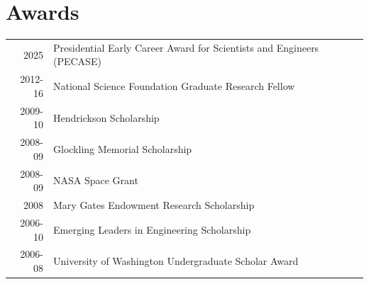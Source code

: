 \documentclass[a4paper,10pt]{article} %
\begin{document}




\section{Awards}

\begin{table}[H]
\begin{tabular}{rl}
  \textsc{2025} & Presidential Early Career Award for Scientists and Engineers (PECASE) \\
\textsc{2012-16} & National Science Foundation Graduate Research Fellow \\
\textsc{2009-10} & Hendrickson Scholarship\\
\textsc{2008-09} & Glockling Memorial Scholarship\\
\textsc{2008-09} & NASA Space Grant\\
\textsc{2008} & Mary Gates Endowment Research Scholarship\\
\textsc{2006-10} & Emerging Leaders in Engineering Scholarship\\
\textsc{2006-08} & University of Washington Undergraduate Scholar Award\\
\end{tabular}
\end{table}

\FloatBarrier

\end{document}
